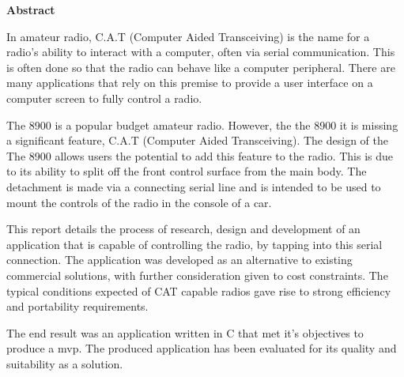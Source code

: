 \thispagestyle{empty}

\begin{center}
    {\LARGE\bf Abstract}
\end{center}

In amateur radio, C.A.T (Computer Aided Transceiving) is the name for a radio's ability to interact with a computer, often via serial communication. This is often done so that the radio can behave like a computer peripheral. There are many applications that rely on this premise to provide a user interface on a computer screen to fully control a radio.

The \gls{8900} is a popular budget amateur radio. However, the the \gls{8900} it is missing a significant feature, C.A.T (Computer Aided Transceiving). The design of the The \gls{8900} allows users the potential to add this feature to the radio. This is due to its ability to split off the front control surface from the main body. The detachment is made via a connecting serial line and is intended to be used to mount the controls of the radio in the console of a car. 

This report details the process of research, design and development of an application that is capable of controlling the radio, by tapping into this serial connection. The application was developed as an alternative to existing commercial solutions, with further consideration given to cost constraints. The typical conditions expected of CAT capable radios gave rise to strong efficiency and portability requirements. 

The end result was an application written in C that met it's objectives to produce a \gls{mvp}. The produced application has been evaluated for its quality and suitability as a solution.